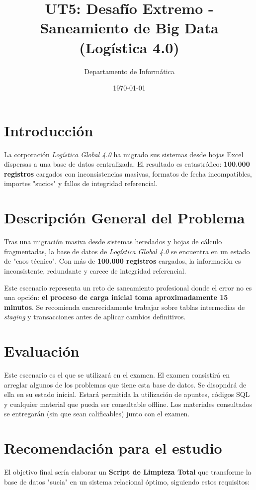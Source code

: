\documentclass[12pt,a4paper]{article}
\title{\textbf{UT5: Desafío Extremo - Saneamiento de Big Data (Logística 4.0)}}
\author{Departamento de Informática}
\date{\today}
\begin{document}
\maketitle

\section*{Introducción}
La corporación \textit{Logística Global 4.0} ha migrado sus sistemas desde hojas Excel dispersas a una base de datos centralizada. El resultado es catastrófico: \textbf{100.000 registros} cargados con inconsistencias masivas, formatos de fecha incompatibles, importes "sucios" y fallos de integridad referencial.

\section*{Descripción General del Problema}
Tras una migración masiva desde sistemas heredados y hojas de cálculo fragmentadas, la base de datos de \textit{Logística Global 4.0} se encuentra en un estado de "caos técnico". Con más de \textbf{100.000 registros} cargados, la información es inconsistente, redundante y carece de integridad referencial. 

Este escenario representa un reto de saneamiento profesional donde el error no es una opción: \textbf{el proceso de carga inicial toma aproximadamente 15 minutos}.
%
Se recomienda encarecidamente trabajar sobre tablas intermedias de \textit{staging} y transacciones antes de aplicar cambios definitivos.


\section{Evaluación}
Este escenario es el que se utilizará en el examen. 
%
El examen consistirá en arreglar algunos de los problemas que tiene esta base de datos. 
%
Se disopndrá de ella en su estado inicial. 
%
Estará permitida la utilización de apuntes, códigos SQL y cualquier material que pueda ser consultable offline. 
%
Los materiales consultados se entregarán (sin que sean calificables) junto con el examen.


\section{Recomendación para el estudio}
El objetivo final sería elaborar un \textbf{Script de Limpieza Total} que transforme la base de datos "sucia" en un sistema relacional óptimo, siguiendo estos requisitos:
\end{document}
